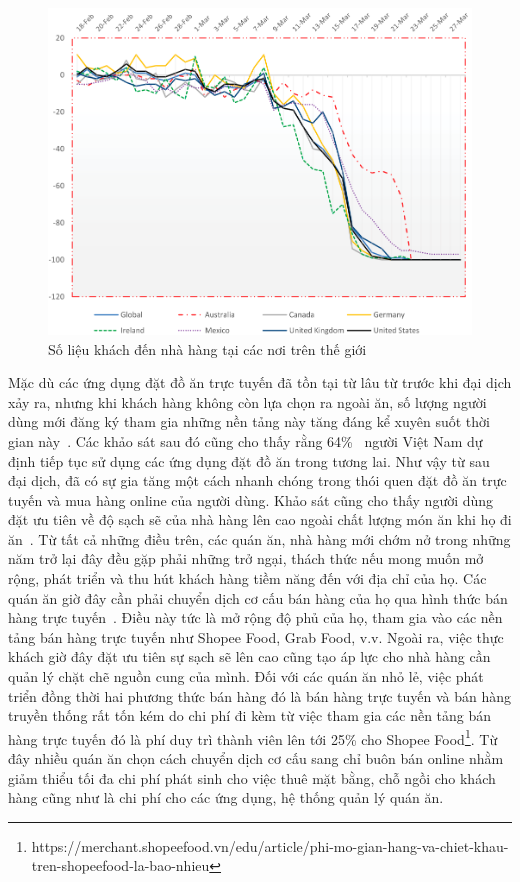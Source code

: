 \begin{figure}[ht]
	\centering
	\includegraphics[width=\textwidth]{images/hChip/state-of-global-restaurant-industry-2020.png}
	\caption{Số liệu khách đến nhà hàng tại các nơi trên thế giới~\cite{dube2021covid}}
	\label{fig:state-of-global-restaurant-industry-2020}
\end{figure}

Mặc dù các ứng dụng đặt đồ ăn trực tuyến đã tồn tại từ lâu từ trước khi đại dịch xảy ra, nhưng khi khách hàng không còn lựa chọn ra ngoài ăn, số lượng người dùng mới đăng ký tham gia những nền tảng này tăng đáng kể xuyên suốt thời gian này~\cite{hoang2021customer}.
Các khảo sát sau đó cũng cho thấy rằng 64\%~\cite{pham2020study} người Việt Nam dự định tiếp tục sử dụng các ứng dụng đặt đồ ăn trong tương lai.
Như vậy từ sau đại dịch, đã có sự gia tăng một cách nhanh chóng trong thói quen đặt đồ ăn trực tuyến và mua hàng online của người dùng.
Khảo sát cũng cho thấy người dùng đặt ưu tiên về độ sạch sẽ của nhà hàng lên cao ngoài chất lượng món ăn khi họ đi ăn~\cite{hoang2021customer}.
Từ tất cả những điều trên, các quán ăn, nhà hàng mới chớm nở trong những năm trở lại đây đều gặp phải những trở ngại, thách thức nếu mong muốn mở rộng, phát triển và thu hút khách hàng tiềm năng đến với địa chỉ của họ.
Các quán ăn giờ đây cần phải chuyển dịch cơ cấu bán hàng của họ qua hình thức bán hàng trực tuyến~\cite{matsenko2021transformation}.
Điều này tức là mở rộng độ phủ của họ, tham gia vào các nền tảng bán hàng trực tuyến như Shopee Food, Grab Food, v.v.
Ngoài ra, việc thực khách giờ đây đặt ưu tiên sự sạch sẽ lên cao cũng tạo áp lực cho nhà hàng cần quản lý chặt chẽ nguồn cung của mình.
Đối với các quán ăn nhỏ lẻ, việc phát triển đồng thời hai phương thức bán hàng đó là bán hàng trực tuyến và bán hàng truyền thống rất tốn kém do chi phí đi kèm từ việc tham gia các nền tảng bán hàng trực tuyến đó là phí duy trì thành viên lên tới 25\% cho Shopee Food\footnote{https://merchant.shopeefood.vn/edu/article/phi-mo-gian-hang-va-chiet-khau-tren-shopeefood-la-bao-nhieu}.
Từ đây nhiều quán ăn chọn cách chuyển dịch cơ cấu sang chỉ buôn bán online nhằm giảm thiểu tối đa chi phí phát sinh cho việc thuê mặt bằng, chỗ ngồi cho khách hàng cũng như là chi phí cho các ứng dụng, hệ thống quản lý quán ăn.

